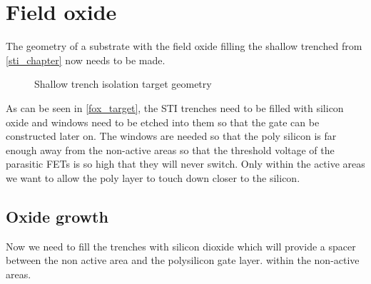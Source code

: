 \section{Field oxide}\label{fox_chapter}

The geometry of a substrate with the field oxide filling the shallow trenched from \autoref{sti_chapter} now needs to be made.

\begin{figure}[H]
	\centering
	\begin{tikzpicture}[node distance = 3cm, auto, thick,scale=\CrossAndTopSectionBig, every node/.style={transform shape}]
		
	\end{tikzpicture}
	\begin{tikzpicture}[node distance = 3cm, auto, thick,scale=\CrossAndTopSectionBig, every node/.style={transform shape}]
		
	\end{tikzpicture}
	\caption{Shallow trench isolation target geometry}
	\label{fox_target}
\end{figure}

As can be seen in \autoref{fox_target}, the STI trenches need to be filled with silicon oxide and windows need to be etched into them so that the gate can be constructed later on.
The windows are needed so that the poly silicon is far enough away from the non-active areas so that the threshold voltage of the parasitic FETs is so high that they will never switch.
Only within the active areas we want to allow the poly layer to touch down closer to the silicon.

\newpage

\subsection{Oxide growth}
Now we need to fill the trenches with silicon dioxide which will provide a spacer between the non active area and the polysilicon gate layer. within the non-active areas.

